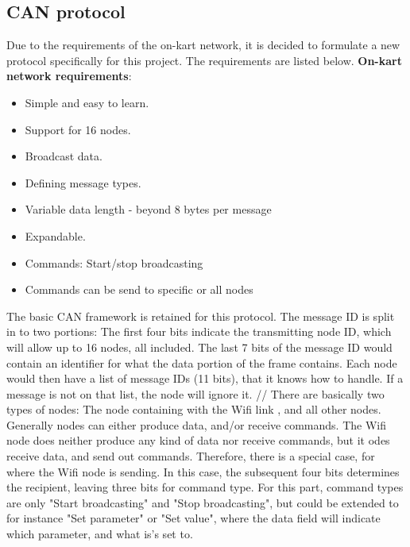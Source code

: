 
\subsection{CAN protocol}\label{sub:CAN_protocol}
Due to the requirements of the on-kart network, it is decided to formulate a new protocol specifically for this project. The requirements are listed below.
\textbf{On-kart network requirements}:
\begin{itemize}
	\item Simple and easy to learn.
	\item Support for 16 nodes.
	\item Broadcast data.
	\item Defining message types.
	\item Variable data length - beyond 8 bytes per message
	\item Expandable.
	\item Commands: Start/stop broadcasting 
	\item Commands can be send to specific or all nodes
\end{itemize}

The basic CAN framework is retained for this protocol. 
The message ID is split in to two portions: The first four bits indicate the transmitting node ID, which will allow up to 16 nodes, all included. 
The last 7 bits of the message ID would contain an identifier for what the data portion of the frame contains.
Each node would then have a list of message IDs (11 bits), that it knows how to handle.
If a message is not on that list, the node will ignore it.
//
There are basically two types of nodes: The node containing with the Wifi link , and all other nodes.
Generally nodes can either produce data, and/or receive commands.
The Wifi node does neither produce any kind of data nor receive commands, but it odes receive data, and send out commands.
Therefore, there is a special case, for where the Wifi node is sending.
In this case, the subsequent four bits determines the recipient, leaving three bits for command type. 
For this part, command types are only "Start broadcasting" and "Stop broadcasting", but could be extended to for instance "Set parameter" or "Set value", where the data field will indicate which parameter, and what is's set to.


